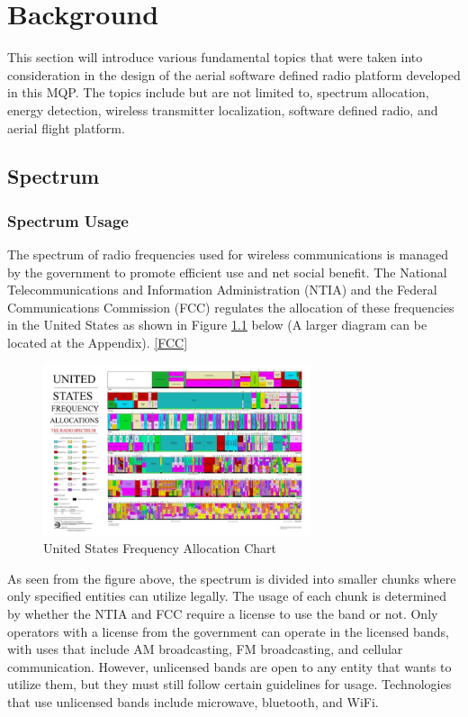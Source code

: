 \chapter{Background}
This section will introduce various fundamental topics that were taken into consideration in the design of the aerial software defined radio platform developed in this MQP. The topics include but are not limited to, spectrum allocation, energy detection, wireless transmitter localization, software defined radio, and aerial flight platform.

\section{Spectrum}
\subsection{Spectrum Usage}
The spectrum of radio frequencies used for wireless communications is managed by the government to promote efficient use and net social benefit. The National Telecommunications and Information Administration (NTIA) and the Federal Communications Commission (FCC) regulates the allocation of these frequencies in the United States as shown in Figure \ref{fig:freq_chart} below (A larger diagram can be located at the Appendix). \ref{FCC}
\begin{figure}[ht]
\centering
\includegraphics[width=0.70\textwidth]{img/the_radio_spectrum.jpg}
\caption{United States Frequency Allocation Chart}
\label{fig:freq_chart}
\end{figure}
As seen from the figure above, the spectrum is divided into smaller chunks where only specified entities can utilize legally. The usage of each chunk is determined by whether the NTIA and FCC require a license to use the band or not. Only operators with a license from the government can operate in the licensed bands, with uses that include AM broadcasting, FM broadcasting, and cellular communication. However, unlicensed bands are open to any entity that wants to utilize them, but they must still follow certain guidelines for usage. Technologies that use unlicensed bands include microwave, bluetooth, and WiFi.

